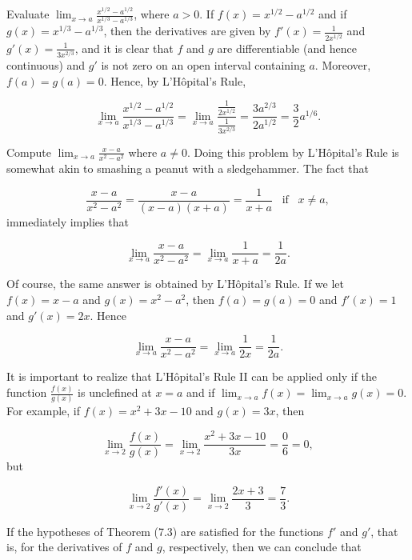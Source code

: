 \begin{example}
Evaluate $\lim_{x \rightarrow a}\frac{x^{1/2} - a^{1/2}}{x^{1/3} - a^{1/3}}$, where $a > 0$. If $f(x) = x^{1/2} - a^{1/2}$ and if $g(x) = x^{1/3} - a^{1/3}$, then the derivatives are given by $f' (x) = \frac{1}{2x^{1/2}}$ and $g'(x) = \frac{1}{3x^{2/3}}$, and it is clear that $f$ and $g$ are differentiable (and hence continuous) and $g'$ is not zero on an open interval containing $a$.  Moreover,
$f(a) = g(a) = 0$. Hence, by L'H\^{o}pital's Rule,

$$
\lim_{x \rightarrow a}\frac{x^{1/2} - a^{1/2}}{x^{1/3} -a^{1/3}} 
= \lim_{x \rightarrow a} \frac {\frac{1}{2x^{1/2}}}{\frac{1}{3x^{2/3}}} = \frac{3a^{2/3}}{2a^{1/2}} = \frac{3}{2} a^{1/6}.
$$
\end{example}
\medskip

\begin{example}
Compute $\lim_{x \rightarrow a}\frac{x - a}{x^2 - a^2}$ where $a \neq 0 $. Doing this problem by L'H\^{o}pital's Rule is somewhat akin to smashing a peanut with a sledgehammer. The fact that

$$
\frac{x - a}{x^2 - a^2} = \frac{x - a}{(x - a)(x + a)} = \frac{1}{x + a}  \;\;\; \mbox{if} \;\;\; x \neq a,
$$
\noindent immediately implies that 

$$\lim_{x \rightarrow a}\frac{x - a}{x^2 - a^2}  = \lim_{x \rightarrow a} \frac{1}{x + a} = \frac{1}{2a}.
$$

\noindent Of course, the same answer is obtained by L'H\^{o}pital's Rule. If we let $f(x) = x - a$ and $g(x) = x^2 - a^2$, then $f(a) = g(a) = 0$ and $f'(x) = 1$ and $g'(x) = 2x$. Hence

$$
\lim_{x \rightarrow a} \frac{x - a}{x^2 - a^2} = \lim_{x \rightarrow a}\frac{1}{2x} = \frac{1}{2a}.
$$
\end{example}

It is important to realize that L'H\^{o}pital's Rule II can be applied only if the function $\frac{f(x)}{g(x)}$ is unclefined at $x = a$ and if $\lim_{x \rightarrow a}f(x) = \lim_{x \rightarrow a} g(x) = 0.$  For example, if $f(x) = x^2 + 3x - 10$ and $g(x) = 3x$, then 

$$
\lim_{x \rightarrow 2} \frac{f(x)}{g(x)} = \lim_{x \rightarrow 2}\frac{x^2 + 3x -10}{3x} = \frac{0}{6} = 0,
$$
\noindent but 

$$
\lim_{x \rightarrow 2}\frac{f'(x)}{g'(x)} = \lim_{x \rightarrow 2} \frac{2x + 3}{3} = \frac{7}{3}.
$$

If the hypotheses of Theorem (7.3) are satisfied for the functions $f'$ and $g'$, that is, for the derivatives of $f$ and $g$, respectively, then we can conclude that

